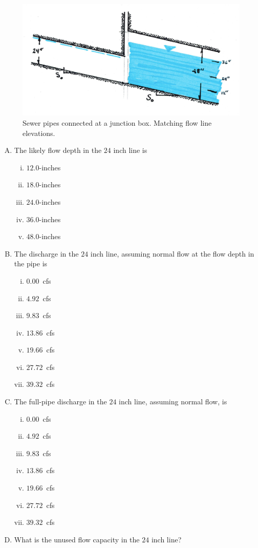 \documentclass[11pt]{article}
\begin{document}
\begin{enumerate}
\begin{figure}[h!] %
\centering
   \includegraphics[width=5in]{SewerPipeMatchFlowlineDeep.jpg}
   \caption{Sewer pipes connected at a junction box.  Matching flow line elevations.}
   \label{fig:SewerPipeMatchFlowlineDeep} 
\end{figure}

\begin{enumerate}[(A)]
\item The likely flow depth in the $24$ inch line is
\begin{enumerate} [i)]
\item $12.0$-inches 
\item $18.0$-inches 
\item $24.0$-inches 
\item $36.0$-inches
\item $48.0$-inches
\end{enumerate} 
\item The discharge in the $24$ inch line, assuming normal flow at the flow depth in the pipe is 
\begin{enumerate} [i)]
\item $0.00$~cfs
\item $4.92$~cfs
\item $9.83$~cfs
\item $13.86$~cfs 
\item $19.66$~cfs
\item $27.72$~cfs
\item $39.32$~cfs
\end{enumerate} 
\item The full-pipe discharge in the $24$ inch line, assuming normal flow, is
\begin{enumerate} [i)]
\item $0.00$~cfs
\item $4.92$~cfs
\item $9.83$~cfs
\item $13.86$~cfs 
\item $19.66$~cfs
\item $27.72$~cfs
\item $39.32$~cfs
\end{enumerate} 
\item What is the unused flow capacity in the $24$ inch line? ~\\ ~\\
\end{enumerate}


\end{enumerate}
\end{document}
